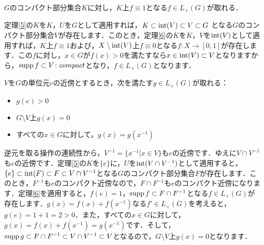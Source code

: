 \begin{ylem}\label{14}
$G$のコンパクト部分集合$K$に対し，$K$上$f \equiv 1$となる$f \in L_{+}(G)$が取れる．
\end{ylem}
\begin{Proof}
定理\ref{5}の$K$を$K$，$U$を$G$として適用すれば，$K \subset \operatorname{int}(V) \subset V \subset G$ となる$G$のコンパクト部分集合$V$が存在します．このとき，定理\ref{6}の$K$を$K$，$V$を$\operatorname{int}(V)$として適用すれば，$K$上$f \equiv 1$および，$X \setminus \operatorname{int}(V)$上$f \equiv 0$となる$f \colon X \to [0, 1]$が存在します．この$f$に対し，$x \in G$が$f(x)>0$を満たすなら$x \in \operatorname{int}(V) \subset V$となりますから，$\operatorname{supp} f \subset V \colon compact$となり，$f \in L_{+}(G)$となります．
\end{Proof}
\begin{ylem}\label{15}
$V$を$G$の単位元$e$の近傍とするとき，次を満たす$g \in L_{+}(G)$が取れる：
\begin{itemize}
 \item $g(e)>0$
 \item $G \setminus V$上$g(x)=0$
 \item すべての$x \in G$に対して，$g(x)=g(x^{-1})$
\end{itemize}
\end{ylem}
\begin{Proof}
逆元を取る操作の連続性から，$V^{-1}=\{ x^{-1} | x \in V \}$も$e$の近傍です．ゆえに$V \cap V^{-1}$も$e$の近傍です．定理\ref{5}の$K$を$\{e\}$に，$U$を$\operatorname{int}(V \cap V^{-1})$として適用すると，$\{e\} \subset \operatorname{int}(F) \subset F \subset V \cap V^{-1}$となる$G$のコンパクト部分集合$F$が存在します．このとき，$F^{-1}$も$e$のコンパクト近傍なので，$F \cap F^{-1}$も$e$のコンパクト近傍になります．定理\ref{6}を適用すると，$f(e)=1$，$\operatorname{supp} f \subset F \cap F^{-1}$となる$f \in L_{+}(G)$が存在します．$g(x)=f(x)+f(x^{-1})$なる$f' \in L_{+}(G)$を考えると，$g(e)=1+1=2>0$．また，すべての$x \in G$に対して，$g(x)=f(x)+f(x^{-1})=g(x^{-1})$です．そして，$\operatorname{supp} g \subset F \cap F^{-1} \subset V \cap V^{-1} \subset V$となるので，$G \setminus V$上$g(x)=0$となります．　
\end{Proof}

